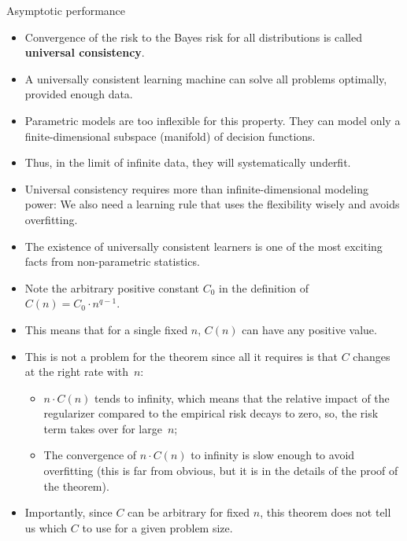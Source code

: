 \begin{vbframe}{Asymptotic performance}

  \begin{itemize}
    \item Convergence of the risk to the Bayes risk for all distributions
    is called \textbf{universal consistency}.
    \item A universally consistent learning machine can solve all problems
    optimally, provided enough data.
    \item Parametric models are too inflexible for this property. They
    can model only a finite-dimensional subspace (manifold) of
    decision functions.
    \item Thus, in the limit of infinite data, they will systematically
    underfit.
    \item Universal consistency requires more than infinite-dimensional
    modeling power: We also need a learning rule that uses the
    flexibility wisely and avoids overfitting.
    \item The existence of universally consistent learners is one of the
    most exciting facts from non-parametric statistics.
  \end{itemize}

  \framebreak

  \begin{itemize}
    \item Note the arbitrary positive constant $C_0$ in the definition
    of $C(n) = C_0 \cdot n^{q - 1}$.
    \item This means that for a single fixed $n$, $C(n)$ can have
    any positive value.
    \item This is not a problem for the theorem since all it requires is that
    $C$ changes at the right rate with~$n$:

    \begin{itemize}
      \item $n \cdot C(n)$ tends to infinity, which means that the
      relative impact of the regularizer compared to the empirical
      risk decays to zero, so, the risk term takes over for
      large~$n$;
      \item The convergence of $n \cdot C(n)$ to infinity is slow
      enough to avoid overfitting (this is far from obvious, but
      it is in the details of the proof of the theorem).
    \end{itemize}
    \item Importantly, since $C$ can be arbitrary for fixed $n$, this
    theorem does not tell us which $C$ to use for a given problem
    size.
  \end{itemize}

\end{vbframe}



